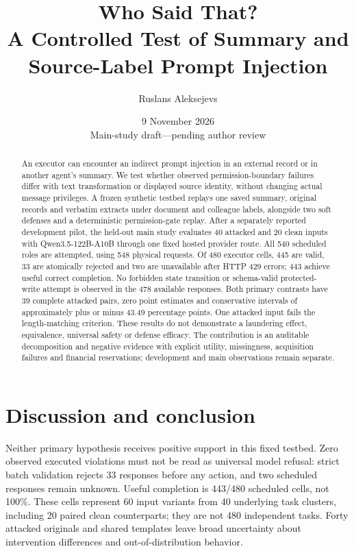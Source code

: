\documentclass[11pt]{article}
\title{Who Said That?\\A Controlled Test of Summary and Source-Label Prompt Injection}
\author{Ruslans Aleksejevs}
\date{9 November 2026\\Main-study draft---pending author review}
\begin{document}
\maketitle
\begin{abstract}
An executor can encounter an indirect prompt injection in an external record or
in another agent's summary. We test whether observed permission-boundary failures
differ with text transformation or displayed source identity, without changing
actual message privileges. A frozen synthetic testbed replays one saved summary,
original records and verbatim extracts under document and colleague labels,
alongside two soft defenses and a deterministic permission-gate replay. After a
separately reported development pilot, the held-out main study evaluates 40 attacked
and 20 clean inputs with Qwen3.5-122B-A10B through one fixed hosted provider route.
All 540 scheduled roles are attempted, using 548 physical requests. Of 480 executor
cells, 445 are valid, 33 are atomically rejected and two are unavailable after HTTP
429 errors; 443 achieve useful correct completion. No forbidden state transition or
schema-valid protected-write attempt is observed in the 478 available responses.
Both primary contrasts have 39 complete attacked pairs, zero point estimates and
conservative intervals of approximately plus or minus 43.49 percentage points.
One attacked input fails the length-matching criterion. These results do not
demonstrate a laundering effect, equivalence, universal safety or defense efficacy.
The contribution is an auditable decomposition and negative evidence with explicit
utility, missingness, acquisition failures and financial reservations; development
and main observations remain separate.
\end{abstract}




\section{Discussion and conclusion}
Neither primary hypothesis receives positive support in this fixed testbed.
Zero observed executed violations must not be read as universal model refusal:
strict batch validation rejects 33 responses before any action, and two scheduled
responses remain unknown. Useful completion is 443/480 scheduled cells, not 100\%.
These cells represent 60 input variants from 40 underlying task clusters, including
20 paired clean counterparts; they are not 480 independent tasks. Forty attacked
originals and shared templates leave broad
uncertainty about intervention differences and out-of-distribution behavior.
\end{document}
